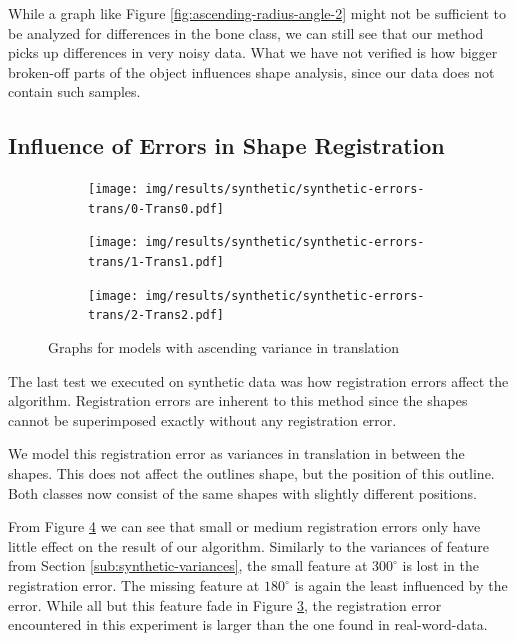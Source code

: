 \documentclass[pdftex,12pt,a4paper]{report}
\begin{document}
While a graph like Figure \ref{fig:ascending-radius-angle-2} might not be sufficient to be analyzed for differences in the bone class, we can still see that our method picks up differences in very noisy data. What we have not verified is how bigger broken-off parts of the object influences shape analysis, since our data does not contain such samples.

\subsection{Influence of Errors in Shape Registration}

\begin{figure}[h]
	\centering
	\begin{subfigure}[b]{0.32\textwidth}
		\centering
		\texttt{[image: img/results/synthetic/synthetic-errors-trans/0-Trans0.pdf]}
		\label{fig:ascending-translation-0}
	\end{subfigure}
	\begin{subfigure}[b]{0.32\textwidth}
		\centering
		\texttt{[image: img/results/synthetic/synthetic-errors-trans/1-Trans1.pdf]}
		\label{fig:ascending-translation-1}
	\end{subfigure}
	\begin{subfigure}[b]{0.32\textwidth}
		\centering
		\texttt{[image: img/results/synthetic/synthetic-errors-trans/2-Trans2.pdf]}
		\label{fig:ascending-translation-2}
	\end{subfigure}
	\caption{Graphs for models with ascending variance in translation}
	\label{fig:ascending-translation}
\end{figure}

The last test we executed on synthetic data was how registration errors affect the algorithm. Registration errors are inherent to this method since the shapes cannot be superimposed exactly without any registration error.

We model this registration error as variances in translation in between the shapes. This does not affect the outlines shape, but the position of this outline. Both classes now consist of the same shapes with slightly different positions.

From Figure \ref{fig:ascending-translation} we can see that small or medium registration errors only have little effect on the result of our algorithm. Similarly to the variances of feature from Section \ref{sub:synthetic-variances}, the small feature at $300^\circ$ is lost in the registration error. The missing feature at $180^\circ$ is again the least influenced by the error. While all but this feature fade in Figure \ref{fig:ascending-translation-2}, the registration error encountered in this experiment is larger than the one found in real-word-data.
\end{document}
